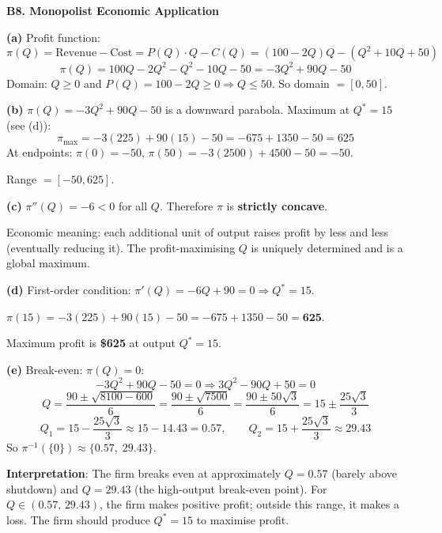 \documentclass[12pt, a4paper]{article}
\theoremstyle{definition}
\begin{document}
\begin{solbox}
\textbf{B8. Monopolist Economic Application}

\textbf{(a)} Profit function:
\[
  \pi(Q) = \text{Revenue} - \text{Cost} = P(Q)\cdot Q - C(Q) = (100-2Q)Q - (Q^2+10Q+50)
\]
\[
  \pi(Q) = 100Q - 2Q^2 - Q^2 - 10Q - 50 = -3Q^2 + 90Q - 50
\]
Domain: $Q\geq 0$ and $P(Q)=100-2Q\geq 0 \Rightarrow Q\leq 50$. So domain $=[0,50]$.

\textbf{(b)} $\pi(Q)=-3Q^2+90Q-50$ is a downward parabola. Maximum at $Q^*=15$ (see (d)):
\[
  \pi_{\max} = -3(225)+90(15)-50 = -675+1350-50 = 625
\]
At endpoints: $\pi(0)=-50$, $\pi(50)=-3(2500)+4500-50=-50$.

Range $= [-50, 625]$.

\textbf{(c)} $\pi''(Q) = -6 < 0$ for all $Q$. Therefore $\pi$ is \textbf{strictly concave}.

Economic meaning: each additional unit of output raises profit by less and less (eventually reducing it). The profit-maximising $Q$ is uniquely determined and is a global maximum.

\textbf{(d)} First-order condition: $\pi'(Q)=-6Q+90=0 \Rightarrow Q^*=15$.

$\pi(15) = -3(225)+90(15)-50 = -675+1350-50 = \mathbf{625}$.

Maximum profit is \textbf{\$625} at output $Q^*=15$.

\textbf{(e)} Break-even: $\pi(Q)=0$:
\[
  -3Q^2+90Q-50=0 \Rightarrow 3Q^2-90Q+50=0
\]
\[
  Q = \frac{90\pm\sqrt{8100-600}}{6} = \frac{90\pm\sqrt{7500}}{6} = \frac{90\pm 50\sqrt{3}}{6} = 15\pm\frac{25\sqrt{3}}{3}
\]
\[
  Q_1 = 15 - \frac{25\sqrt{3}}{3}\approx 15-14.43=0.57, \qquad Q_2=15+\frac{25\sqrt{3}}{3}\approx 29.43
\]
So $\pi^{-1}(\{0\})\approx \{0.57,\; 29.43\}$.

\textbf{Interpretation}: The firm breaks even at approximately $Q=0.57$ (barely above shutdown) and $Q=29.43$ (the high-output break-even point). For $Q\in(0.57,\,29.43)$, the firm makes positive profit; outside this range, it makes a loss. The firm should produce $Q^*=15$ to maximise profit.
\end{solbox}
\end{document}
